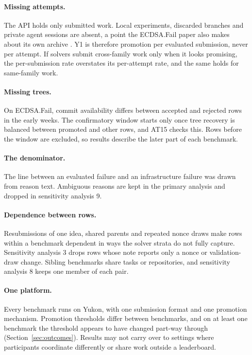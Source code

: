 \paragraph{Missing attempts.}
The API holds only submitted work.
Local experiments, discarded branches and private agent sessions are absent, a point the ECDSA.Fail paper also makes about its own archive \citep[\S6]{long2026ecdsafail}.
Y1 is therefore promotion per evaluated submission, never per attempt.
If solvers submit cross-family work only when it looks promising, the per-submission rate overstates its per-attempt rate, and the same holds for same-family work.

\paragraph{Missing trees.}
On ECDSA.Fail, commit availability differs between accepted and rejected rows in the early weeks.
The confirmatory window starts only once tree recovery is balanced between promoted and other rows, and AT15 checks this.
Rows before the window are excluded, so results describe the later part of each benchmark.

\paragraph{The denominator.}
The line between an evaluated failure and an infrastructure failure was drawn from reason text.
Ambiguous reasons are kept in the primary analysis and dropped in sensitivity analysis 9.

\paragraph{Dependence between rows.}
Resubmissions of one idea, shared parents and repeated nonce draws make rows within a benchmark dependent in ways the solver strata do not fully capture.
Sensitivity analysis 3 drops rows whose note reports only a nonce or validation-draw change.
Sibling benchmarks share tasks or repositories, and sensitivity analysis 8 keeps one member of each pair.

\paragraph{One platform.}
Every benchmark runs on Yukon, with one submission format and one promotion mechanism.
Promotion thresholds differ between benchmarks, and on at least one benchmark the threshold appears to have changed part-way through (Section~\ref{sec:outcomes}).
Results may not carry over to settings where participants coordinate differently or share work outside a leaderboard.

